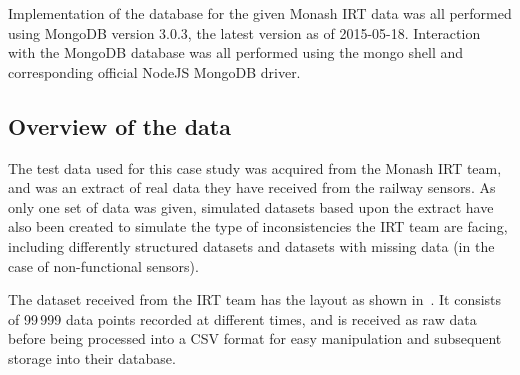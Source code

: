 \documentclass[a4paper,11pt]{article}
\begin{document}
Implementation of the database for the given Monash IRT data was all performed using MongoDB version 3.0.3, the latest
version as of 2015-05-18. Interaction with the MongoDB database was all performed using the mongo shell and corresponding
official NodeJS MongoDB driver.

\subsection{Overview of the data} %
\label{sub:overview_of_the_data}

The test data used for this case study was acquired from the Monash IRT team, and was an extract of real data they have
received from the railway sensors. As only one set of data was given, simulated datasets based upon the extract have
also been created to simulate the type of inconsistencies the IRT team are facing, including differently structured
datasets and datasets with missing data (in the case of non-functional sensors).

The dataset received from the IRT team has the layout as shown in~. It consists of 99\,999 data points
recorded at different times, and is received as raw data before being processed into a CSV format for easy manipulation
and subsequent storage into their database.
\end{document}
